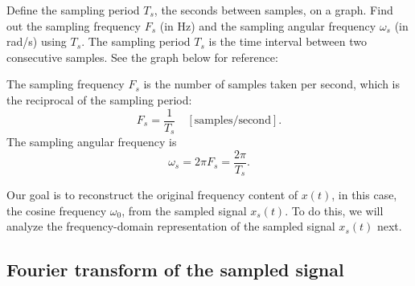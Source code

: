 \begin{popquiz}
Define the sampling period $T_s$, the seconds between samples, on a graph. Find out the sampling frequency $F_s$ (in Hz) and the sampling angular frequency $\omega_s$ (in rad/s) using $T_s$. 
\popqsplit
The sampling period $T_s$ is the time interval between two consecutive samples. See the graph below for reference:
\begin{center}
\end{center}
The sampling frequency $F_s$ is the number of samples taken per second, which is the reciprocal of the sampling period:
\[
F_s = \frac{1}{T_s}\quad[\text{samples/second}].
\]
The sampling angular frequency is
\[
\omega_s = 2\pi F_s = \frac{2\pi}{T_s}.
\]
\end{popquiz}

Our goal is to reconstruct the original frequency content of $x(t)$, in this case, the cosine frequency $\omega_0$, from the sampled signal $x_s(t)$. To do this, we will analyze the frequency-domain representation of the sampled signal $x_s(t)$ next.

\subsection{Fourier transform of the sampled signal}

